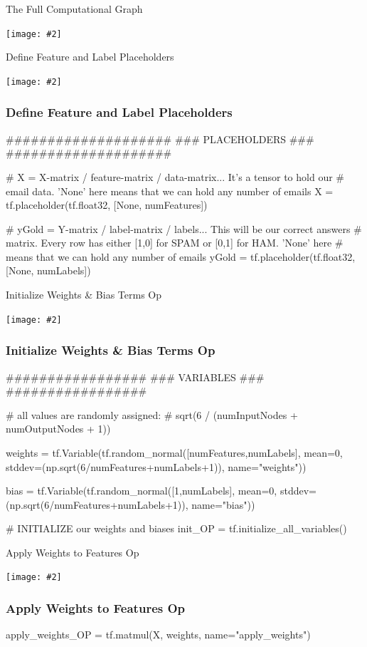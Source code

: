 \documentclass[14pt]{beamer}
\newcommand {\framedgraphic}[2] { %
    \begin{frame}{#1}
        \begin{center}
            \texttt{[image: \#2]}
        \end{center}
    \end{frame}
}
\begin{document}


\framedgraphic{The Full Computational Graph}{full-graph.png}

\framedgraphic{Define Feature and Label Placeholders}{define-X-Y-matrices.png}

\begin{frame}[fragile]
  \frametitle{Define Feature and Label Placeholders}
  \begin{python}
####################
### PLACEHOLDERS ###
####################

# X = X-matrix / feature-matrix / data-matrix... It's a tensor to hold our
# email data. 'None' here means that we can hold any number of emails
X = tf.placeholder(tf.float32, [None, numFeatures])

# yGold = Y-matrix / label-matrix / labels... This will be our correct answers
# matrix. Every row has either [1,0] for SPAM or [0,1] for HAM. 'None' here 
# means that we can hold any number of emails
yGold = tf.placeholder(tf.float32, [None, numLabels])
  \end{python}
\end{frame}


\framedgraphic{Initialize Weights \& Bias Terms Op}{1-initialization.png}

\begin{frame}[fragile]
  \frametitle{Initialize Weights \& Bias Terms Op}
  \begin{python}
#################
### VARIABLES ###
#################

# all values are randomly assigned:
# sqrt(6 / (numInputNodes + numOutputNodes + 1))

weights = tf.Variable(tf.random_normal([numFeatures,numLabels],
          mean=0,
          stddev=(np.sqrt(6/numFeatures+numLabels+1)),
          name="weights"))

bias = tf.Variable(tf.random_normal([1,numLabels],
       mean=0,
       stddev=(np.sqrt(6/numFeatures+numLabels+1)),
       name="bias"))


# INITIALIZE our weights and biases
init_OP = tf.initialize_all_variables()
  \end{python}
\end{frame}


\framedgraphic{Apply Weights to Features Op}{2-apply-weights.png}

\begin{frame}[fragile]
  \frametitle{Apply Weights to Features Op}
  \begin{python}
apply_weights_OP = tf.matmul(X, weights, name="apply_weights")
  \end{python}
\end{frame}
\end{document}
